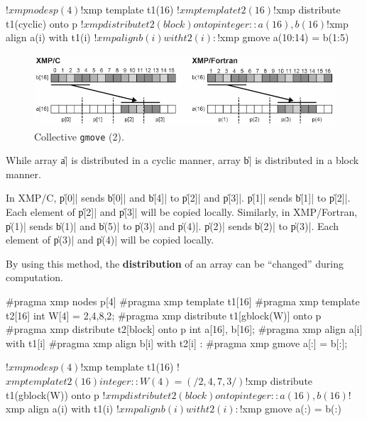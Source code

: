 \begin{XFexample}
!$xmp nodes p(4)
!$xmp template t1(16)
!$xmp template t2(16)
!$xmp distribute t1(cyclic) onto p
!$xmp distribute t2(block) onto p
integer :: a(16), b(16)
!$xmp align a(i) with t1(i)
!$xmp align b(i) with t2(i)
     :
!$xmp gmove
  a(10:14) = b(1:5)
\end{XFexample}

\begin{figure}
  \centering
  \includegraphics[width=\textwidth]{figs/gmove_cyclic.png}
  \caption{Collective {\tt gmove} (2).}
\end{figure}

While array \|a| is distributed in a cyclic manner, array \|b| is
distributed in a block manner.

In XMP/C, \|p[0]| sends \|b[0]| and \|b[4]| to \|p[2]| and
\|p[3]|. \|p[1]| sends \|b[1]| to \|p[2]|. Each element of \|p[2]| and
\|p[3]| will be copied locally. Similarly, in XMP/Fortran, \|p(1)| sends
\|b(1)| and \|b(5)| to \|p(3)| and \|p(4)|. \|p(2)| sends \|b(2)| to
\|p(3)|. Each element of \|p(3)| and \|p(4)| will be copied locally.


By using this method, the {\bf distribution} of an array can be ``changed''
during computation.

\begin{XCexample}
#pragma xmp nodes p[4]
#pragma xmp template t1[16]
#pragma xmp template t2[16]
int W[4] = {2,4,8,2};
#pragma xmp distribute t1[gblock(W)] onto p
#pragma xmp distribute t2[block] onto p
int a[16], b[16];
#pragma xmp align a[i] with t1[i]
#pragma xmp align b[i] with t2[i]
     :
#pragma xmp gmove
  a[:] = b[:];
\end{XCexample}

\begin{XFexample}
!$xmp nodes p(4)
!$xmp template t1(16)
!$xmp template t2(16)
integer :: W(4) = (/2,4,7,3/)
!$xmp distribute t1(gblock(W)) onto p
!$xmp distribute t2(block) onto p
integer :: a(16), b(16)
!$xmp align a(i) with t1(i)
!$xmp align b(i) with t2(i)
     :
!$xmp gmove
  a(:) = b(:)
\end{XFexample}

